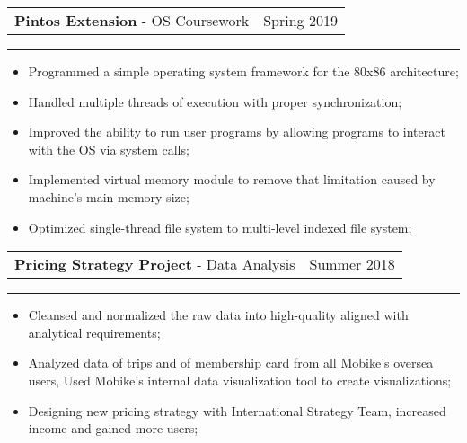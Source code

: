 \documentclass[letter,10.5pt]{article}
\makeatletter
\newcommand{\resentryproj}[5]{
  \begin{minipage}[t]{\linewidth}
    \setlength\tabcolsep{0pt}
    \begin{tabular*}{\linewidth}{l@{\extracolsep{\fill}}r@{}}
      \textbf{#1} #2 - #3 & #4 \\
    \end{tabular*}
    \rule{3pt}{0pt}
	#5
  \end{minipage}
}
\newenvironment{resitemize}
{\vspace{-10pt}
\begin{itemize}
\setlength{\parskip}{0ex}
\setlength{\leftskip}{-14pt}}
{\end{itemize}}
\makeatother
\begin{document}
\resentryproj
{Pintos Extension}
{}
{OS Coursework}
{Spring 2019}
{
\begin{resitemize}
\item Programmed a simple operating system framework for the 80x86 architecture;
\item Handled multiple threads of execution with proper synchronization;
\item Improved the ability to run user programs by allowing programs to interact with the OS via system calls; 
\item Implemented virtual memory module to remove that limitation caused by machine's main memory size;
\item Optimized single-thread file system to multi-level indexed file system;
\end{resitemize}
}
 
\resentryproj
{Pricing Strategy Project}
{}
{Data Analysis}
{Summer 2018}
{
\begin{resitemize}
\item Cleansed and normalized the raw data into high-quality aligned with analytical requirements;
\item Analyzed data of trips and of membership card from all Mobike's oversea users, Used Mobike’s internal data visualization tool to create visualizations;
\item Designing new pricing strategy with International Strategy Team, increased income and gained more users;
\end{resitemize}
}

\vspace{8pt}
\end{document}

